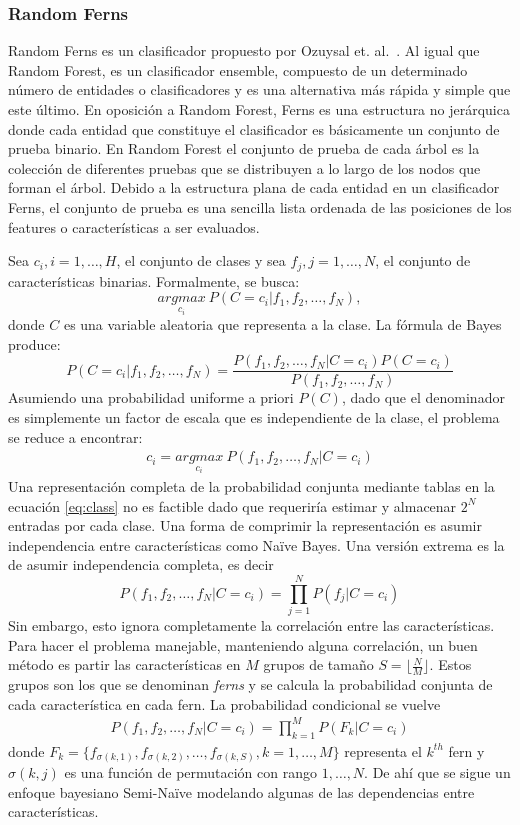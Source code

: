 \subsubsection{Random Ferns} 
\label{subsection:ferns}
	
		Random Ferns es un clasificador propuesto por Ozuysal et. al.~\cite{Ozuysal}. Al igual que Random Forest, es un clasificador ensemble, compuesto de un determinado número de entidades o clasificadores y es una alternativa más rápida y simple que este último. En oposición a Random Forest, Ferns es una estructura no jerárquica donde cada entidad que constituye el clasificador es básicamente un conjunto de prueba binario. En Random Forest el conjunto de prueba de cada árbol es la colección de diferentes pruebas que se distribuyen a lo largo de los nodos que forman el árbol. Debido a la estructura plana de cada entidad en un clasificador Ferns, el conjunto de prueba es una sencilla lista ordenada de las posiciones de los features o características a ser evaluados.
		
		Sea $c_i, i=1,\dots,H$, el conjunto de clases y  sea $f_j, j=1,\dots,N$, el conjunto de características binarias. Formalmente, se busca:
		$$\underset{c_i}{argmax}~P(C=c_i \vert f_1,f_2,\dots,f_N),$$
		donde $C$ es una variable aleatoria que representa a la clase. La fórmula de Bayes produce:
		$$P(C=c_i \vert f_1,f_2,\dots,f_N) = \frac{P(f_1,f_2,\dots,f_N \vert C=c_i)P(C=c_i)}{P(f_1,f_2,\dots,f_N)}$$
		Asumiendo una probabilidad uniforme a priori $P(C)$, dado que el denominador es simplemente un factor de escala que es independiente de la clase, el problema se reduce a encontrar:
		\begin{align}\label{eq:class}
			c_i  = \underset{c_i}{argmax}~P(f_1,f_2,\dots,f_N \vert C=c_i)
		\end{align}
		Una representación completa de la probabilidad conjunta mediante tablas en la ecuación \ref{eq:class} no es factible dado que requeriría estimar y almacenar $2^N$ entradas por cada clase. Una forma de comprimir la representación es asumir independencia entre características como Na\"{i}ve Bayes. Una versión extrema es la de asumir independencia completa, es decir
		$$P(f_1,f_2,\dots,f_N \vert C=c_i) = \prod_{j=1}^NP(f_j \vert C=c_i)$$
		Sin embargo, esto ignora completamente la correlación entre las características. Para hacer el problema manejable, manteniendo alguna correlación, un buen método es partir las características en $M$ grupos de tamaño $S=\lfloor \frac{N}{M} \rfloor$. Estos grupos son los que se denominan \textit{ferns} y se calcula la probabilidad conjunta de cada característica en cada fern. La probabilidad condicional se vuelve
		\begin{align}\label{eq:class2}
			P(f_1,f_2,\dots,f_N \vert C=c_i) = \prod_{k=1}^MP(F_k \vert C=c_i)
		\end{align}
		donde $F_k = \{ f_{\sigma(k,1)},f_{\sigma(k,2)},\dots,f_{\sigma(k,S)}, k=1,\dots,M \}$ representa el $k^{th}$ fern y $\sigma(k,j)$ es una función de permutación con rango $1,\dots,N$. De ahí que se sigue un enfoque bayesiano Semi-Na\"{i}ve modelando algunas de las dependencias entre características.

